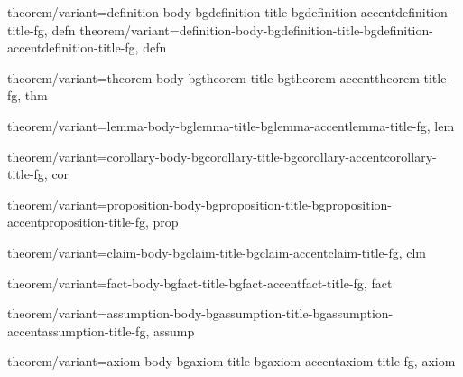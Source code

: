 \let\ThemeFactEnvBegin\fact
\let\ThemeAssumptionEnvBegin\assumption
\let\ThemeAxiomEnvBegin\axiom

\ifEnablePlainAmsthmTheorem\else
    \ifThemeTheoremNumberingNone
        {
            theorem/variant={definition-body-bg}{definition-title-bg}{definition-accent}{definition-title-fg},
        }{defn}
    \else
        {
            theorem/variant={definition-body-bg}{definition-title-bg}{definition-accent}{definition-title-fg},
        }{defn}
    \fi

    {
        theorem/variant={theorem-body-bg}{theorem-title-bg}{theorem-accent}{theorem-title-fg},
    }{thm}

    {
        theorem/variant={lemma-body-bg}{lemma-title-bg}{lemma-accent}{lemma-title-fg},
    }{lem}

    {
        theorem/variant={corollary-body-bg}{corollary-title-bg}{corollary-accent}{corollary-title-fg},
    }{cor}

    {
        theorem/variant={proposition-body-bg}{proposition-title-bg}{proposition-accent}{proposition-title-fg},
    }{prop}

    {
        theorem/variant={claim-body-bg}{claim-title-bg}{claim-accent}{claim-title-fg},
    }{clm}

    {
        theorem/variant={fact-body-bg}{fact-title-bg}{fact-accent}{fact-title-fg},
    }{fact}

    {
        theorem/variant={assumption-body-bg}{assumption-title-bg}{assumption-accent}{assumption-title-fg},
    }{assump}

    {
        theorem/variant={axiom-body-bg}{axiom-title-bg}{axiom-accent}{axiom-title-fg},
    }{axiom}
\fi

